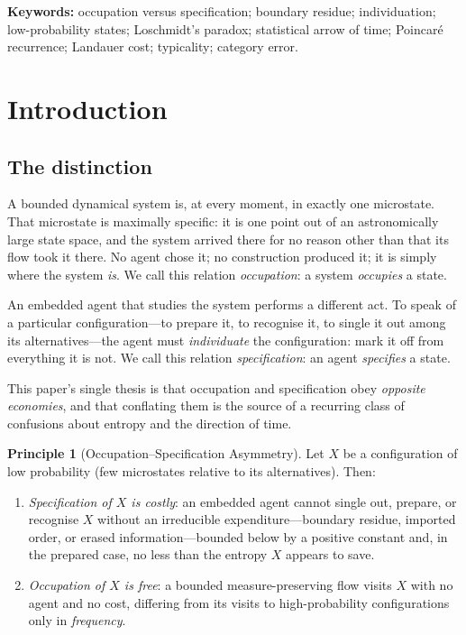 \documentclass[11pt,a4paper]{article}
\theoremstyle{thmstyle}
\theoremstyle{definition}
\newtheorem{principle}[theorem]{Principle}
\theoremstyle{remark}
\begin{document}
\noindent\textbf{Keywords:} occupation versus specification; boundary residue;
individuation; low-probability states; Loschmidt's paradox; statistical arrow
of time; Poincar\'e recurrence; Landauer cost; typicality; category error.

\tableofcontents

\section{Introduction}
\label{sec:intro}

\subsection{The distinction}

A bounded dynamical system is, at every moment, in exactly one microstate.
That microstate is maximally specific: it is one point out of an astronomically
large state space, and the system arrived there for no reason other than that
its flow took it there. No agent chose it; no construction produced it; it is
simply where the system \emph{is}. We call this relation \emph{occupation}: a
system \emph{occupies} a state.

An embedded agent that studies the system performs a different act. To speak of
a particular configuration---to prepare it, to recognise it, to single it out
among its alternatives---the agent must \emph{individuate} the configuration:
mark it off from everything it is not. We call this relation
\emph{specification}: an agent \emph{specifies} a state.

This paper's single thesis is that occupation and specification obey
\emph{opposite economies}, and that conflating them is the source of a
recurring class of confusions about entropy and the direction of time.

\begin{principle}[Occupation--Specification Asymmetry]
\label{prin:asym}
Let $X$ be a configuration of low probability (few microstates relative to its
alternatives). Then:
\begin{enumerate}[label=\textup{(\roman*)},leftmargin=2.4em,nosep]
\item \emph{Specification of $X$ is costly}: an embedded agent cannot single out,
prepare, or recognise $X$ without an irreducible expenditure---boundary residue,
imported order, or erased information---bounded below by a positive constant and,
in the prepared case, no less than the entropy $X$ appears to save.
\item \emph{Occupation of $X$ is free}: a bounded measure-preserving flow visits
$X$ with no agent and no cost, differing from its visits to high-probability
configurations only in \emph{frequency}.
\end{enumerate}
\end{principle}
\end{document}
